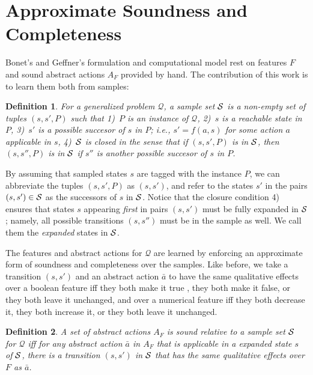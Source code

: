 \documentclass[letterpaper]{article} %
\newtheorem{definition}{Definition}
\newcommand{\Q}{\mathcal{Q}}
\begin{document}
\section{Approximate Soundness and Completeness}


Bonet's and Geffner's formulation and computational model rest on 
features $F$ and  sound abstract actions $A_F$ provided by hand.
The contribution of this work is to learn them both from samples:


\begin{definition}
 For a generalized problem $\Q$, a \emph{sample set}  $\cal S$ is a non-empty set of tuples  $(s,s',P)$
 such that 1)~$P$ is an instance of $\Q$, 2)~$s$ is a reachable state in $P$, 3)~$s'$
 is a possible succesor of $s$ in $P$; i.e., $s'=f(a,s)$ for some action $a$ applicable in $s$,
 4)~$\cal S$ is closed in the sense  that if $(s,s',P)$ is in $\cal S$, then $(s,s'',P)$ is in $\cal S$  if $s''$ is another possible succesor of $s$ in $P$.
\end{definition}

By assuming that sampled states $s$ are tagged with the instance $P$, 
we can abbreviate the tuples $(s,s',P)$ as $(s,s')$, and refer to
the states $s'$ in  the pairs $(s,s') \in {\cal S}$ as the successors
of $s$ in ${\cal S}$. Notice that the closure condition 4) ensures that
states $s$ appearing \emph{first} in pairs $(s,s')$ must be fully expanded in ${\cal S}$;
namely, all possible transitions $(s,s'')$ must be in the sample as well. We call them
the \emph{expanded} states in ${\cal S}$.

The features and abstract actions for $\Q$ are  learned by
enforcing an approximate form of soundness and completeness
over the samples. Like before,  we take a transition $(s,s')$ and an abstract action $\bar{a}$
to have  the same qualitative effects over a boolean  feature  iff they both make it true , they both make it false,  or
they both leave it unchanged,  and over a numerical feature  iff they both decrease it,  they both increase it,  or they both leave it unchanged.

\begin{definition}
  A set of abstract actions $A_F$ is sound \emph{relative to a  sample set} $\cal S$ for $\Q$
  iff for  any  abstract action $\bar{a}$ in $A_F$ that is applicable in  a expanded state $s$ of ${\cal S}$,
  there is a transition $(s,s')$ in $\cal S$ that has the same qualitative  effects over $F$ as $\bar{a}$.
\end{definition}
\end{document}
